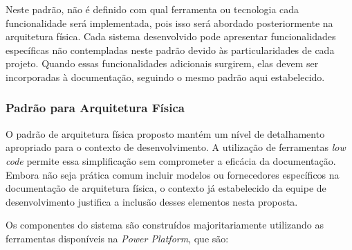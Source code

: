 	Neste padrão, não é definido com qual ferramenta ou tecnologia cada funcionalidade será implementada, pois isso será abordado posteriormente na arquitetura física. Cada sistema desenvolvido pode apresentar funcionalidades específicas não contempladas neste padrão devido às particularidades de cada projeto. Quando essas funcionalidades adicionais surgirem, elas devem ser incorporadas à documentação, seguindo o mesmo padrão aqui estabelecido.

	\subsubsection{Padrão para Arquitetura Física}

	O padrão de arquitetura física proposto mantém um nível de detalhamento apropriado para o contexto de desenvolvimento. A utilização de ferramentas \textit{low code} permite essa simplificação sem comprometer a eficácia da documentação. Embora não seja prática comum incluir modelos ou fornecedores específicos na documentação de arquitetura física, o contexto já estabelecido da equipe de desenvolvimento justifica a inclusão desses elementos nesta proposta.

	Os componentes do sistema são construídos majoritariamente utilizando as ferramentas disponíveis na \textit{Power Platform}, que são:

